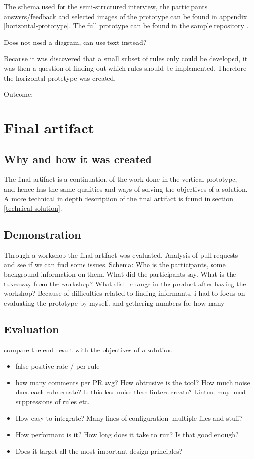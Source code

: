 \documentclass{report}
\begin{document}
The schema used for the semi-structured interview, the participants answers/feedback and selected images of the prototype can be found in appendix \ref{horizontal-prototype}. The full prototype can be found in the sample repository \cite{sample-repository}. 

Does not need a diagram, can use text instead?

Because it was discovered that a small subset of rules only could be developed, it was then a question of finding out which rules should be implemented. Therefore the horizontal prototype was created.


Outcome:


\section{Final artifact}
\subsection*{Why and how it was created}
The final artifact is a continuation of the work done in the vertical prototype, and hence has the same qualities and ways of solving the objectives of a solution. A more technical in depth description of the final artifact is found in section \ref{technical-solution}. 


\subsection*{Demonstration}
Through a workshop the final artifact was evaluated. Analysis of pull requests and see if we can find some issues.
Schema:
Who is the participants, some background information on them. What did the participants say. What is the takeaway from the workshop? What did i change in the product after having the workshop? Because of difficulties related to finding informants, i had to focus on evaluating the prototype by myself, and gethering numbers for how many 

\subsection*{Evaluation}

compare the end result with the objectives of a solution.
\begin{itemize}
    \item false-positive rate / per rule
    \item how many comments per PR avg? How obtrusive is the tool? How much noise does each rule create? Is this less noise than linters create? Linters may need suppressions of rules etc.
    \item How easy to integrate? Many lines of configuration, multiple files and stuff?
    \item How performant is it? How long does it take to run? Is that good enough?
    \item Does it target all the most important design principles?
\end{itemize}
\end{document}

